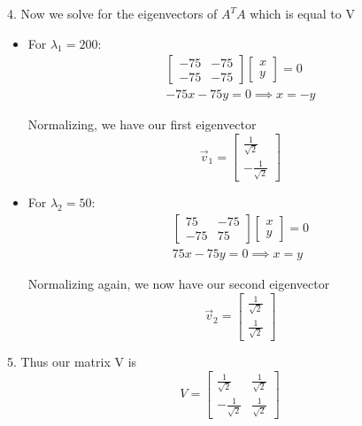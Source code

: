 \documentclass[12pt]{article}
\begin{document}
4. Now we solve for the eigenvectors of $A^TA$ which is equal to V
\begin{itemize}f
    \item For $\lambda_{1} = 200$:
          \begin{align*}
              \begin{bmatrix} -75 & -75 \\ -75 & -75 \end{bmatrix}\begin{bmatrix} x \\ y \end{bmatrix} = 0 \\
              -75x - 75y = 0 \implies{x = -y}
          \end{align*}

          Normalizing, we have our first eigenvector
          \[
              \vec{v}_1 = \begin{bmatrix}\frac{1}{\sqrt{2}} \\ -\frac{1}{\sqrt{2}} \end{bmatrix}
          \]
    \item For $\lambda_{2} = 50$:
          \begin{align*}
              \begin{bmatrix} 75 & -75 \\ -75 & 75 \end{bmatrix}\begin{bmatrix} x \\ y \end{bmatrix} = 0 \\
              75x - 75y = 0 \implies{x = y}
          \end{align*}

          Normalizing again, we now have our second eigenvector
          \[
              \vec{v}_2 = \begin{bmatrix}\frac{1}{\sqrt{2}} \\ \frac{1}{\sqrt{2}} \end{bmatrix}
          \]
\end{itemize}

5. Thus our matrix V is
\begin{equation*}
    V = \begin{bmatrix}\frac{1}{\sqrt{2}} & \frac{1}{\sqrt{2}} \\ -\frac{1}{\sqrt{2}} & \frac{1}{\sqrt{2}} \end{bmatrix}
\end{equation*}
\end{document}
